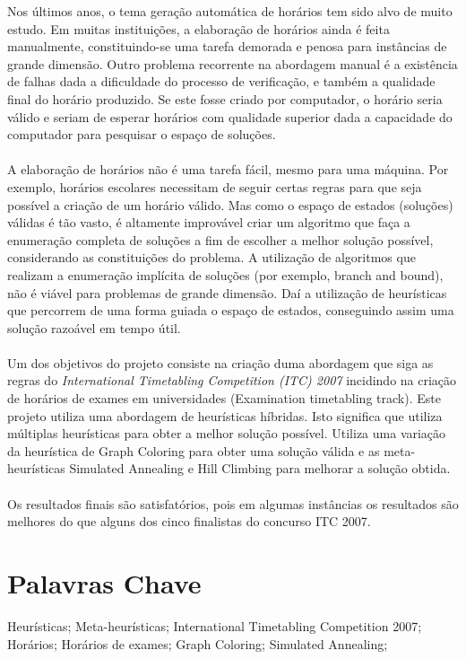 Nos últimos anos, o tema geração automática de horários tem sido alvo de muito estudo. Em muitas instituições, a elaboração de horários ainda é feita manualmente, constituindo-se uma tarefa demorada e penosa para instâncias de grande dimensão. Outro problema recorrente na abordagem manual é a existência de falhas dada a dificuldade do processo de verificação, e também a qualidade final do horário produzido. Se este fosse criado por computador, o horário seria válido e seriam de esperar horários com qualidade superior dada a capacidade do computador para pesquisar o espaço de soluções.\\
\\
A elaboração de horários não é uma tarefa fácil, mesmo para uma máquina. Por exemplo, horários escolares necessitam de seguir certas regras para que seja possível a criação de um horário válido. Mas como o espaço de estados (soluções) válidas é tão vasto, é altamente improvável criar um algoritmo que faça a enumeração completa de soluções a fim de escolher a melhor solução possível, considerando as constituições do problema. A utilização de algoritmos que realizam a enumeração implícita de soluções (por exemplo, branch and bound), não é viável para problemas de grande dimensão. Daí a utilização de heurísticas que percorrem de uma forma guiada o espaço de estados, conseguindo assim uma solução razoável em tempo útil.\\
\\
Um dos objetivos do projeto consiste na criação duma abordagem que siga as regras do \textit{International Timetabling Competition (ITC) 2007} incidindo na criação de horários de exames em universidades (Examination timetabling track). Este projeto utiliza uma abordagem de heurísticas híbridas. Isto significa que utiliza múltiplas heurísticas para obter a melhor solução possível. Utiliza uma variação da heurística de Graph Coloring para obter uma solução válida e as meta-heurísticas Simulated Annealing e Hill Climbing para melhorar a solução obtida.\\
\\
Os resultados finais são satisfatórios, pois em algumas instâncias os resultados são melhores do que alguns dos cinco finalistas do concurso ITC 2007.
\
\section*{Palavras Chave}

Heurísticas; Meta-heurísticas; International Timetabling Competition 2007; Horários; Horários de exames; Graph Coloring; Simulated Annealing;
\

